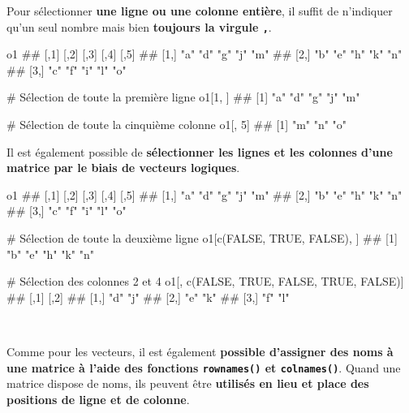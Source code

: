 \documentclass[12pt,twosided, notitlepage]{book}
\newenvironment{Shaded}{}{}
\newcommand{\CommentTok}[1]{\textcolor[rgb]{0.00,0.50,0.00}{#1}}
\newcommand{\DecValTok}[1]{#1}
\newcommand{\KeywordTok}[1]{\textcolor[rgb]{0.00,0.00,1.00}{#1}}
\newcommand{\NormalTok}[1]{#1}
\newcommand{\OtherTok}[1]{\textcolor[rgb]{1.00,0.25,0.00}{#1}}
\renewenvironment{Shaded}{\begin{snugshade}}{\end{snugshade}}
\begin{document}
Pour sélectionner \textbf{une ligne ou une colonne entière}, il suffit
de n'indiquer qu'un seul nombre mais bien \textbf{toujours la virgule
\texttt{,}}.

\begin{Shaded}
\begin{Highlighting}[]
\NormalTok{o1}
\NormalTok{  ##      [,1] [,2] [,3] [,4] [,5]}
\NormalTok{  ## [1,] "a"  "d"  "g"  "j"  "m" }
\NormalTok{  ## [2,] "b"  "e"  "h"  "k"  "n" }
\NormalTok{  ## [3,] "c"  "f"  "i"  "l"  "o"}

\CommentTok{# Sélection de toute la première ligne}
\NormalTok{o1[}\DecValTok{1}\NormalTok{, ]}
\NormalTok{  ## [1] "a" "d" "g" "j" "m"}

\CommentTok{# Sélection de toute la cinquième colonne}
\NormalTok{o1[, }\DecValTok{5}\NormalTok{]}
\NormalTok{  ## [1] "m" "n" "o"}
\end{Highlighting}
\end{Shaded}

Il est également possible de \textbf{sélectionner les lignes et les
colonnes d'une matrice par le biais de vecteurs logiques}.

\begin{Shaded}
\begin{Highlighting}[]
\NormalTok{o1}
\NormalTok{  ##      [,1] [,2] [,3] [,4] [,5]}
\NormalTok{  ## [1,] "a"  "d"  "g"  "j"  "m" }
\NormalTok{  ## [2,] "b"  "e"  "h"  "k"  "n" }
\NormalTok{  ## [3,] "c"  "f"  "i"  "l"  "o"}

\CommentTok{# Sélection de toute la deuxième ligne}
\NormalTok{o1[}\KeywordTok{c}\NormalTok{(}\OtherTok{FALSE}\NormalTok{, }\OtherTok{TRUE}\NormalTok{, }\OtherTok{FALSE}\NormalTok{), ]}
\NormalTok{  ## [1] "b" "e" "h" "k" "n"}

\CommentTok{# Sélection des colonnes 2 et 4}
\NormalTok{o1[, }\KeywordTok{c}\NormalTok{(}\OtherTok{FALSE}\NormalTok{, }\OtherTok{TRUE}\NormalTok{, }\OtherTok{FALSE}\NormalTok{, }\OtherTok{TRUE}\NormalTok{, }\OtherTok{FALSE}\NormalTok{)]}
\NormalTok{  ##      [,1] [,2]}
\NormalTok{  ## [1,] "d"  "j" }
\NormalTok{  ## [2,] "e"  "k" }
\NormalTok{  ## [3,] "f"  "l"}
\end{Highlighting}
\end{Shaded}

~

Comme pour les vecteurs, il est également \textbf{possible d'assigner
des noms à une matrice à l'aide des fonctions \texttt{rownames()} et
\texttt{colnames()}}.
Quand une matrice dispose de noms, ils peuvent être \textbf{utilisés en
lieu et place des positions de ligne et de colonne}.
\end{document}
